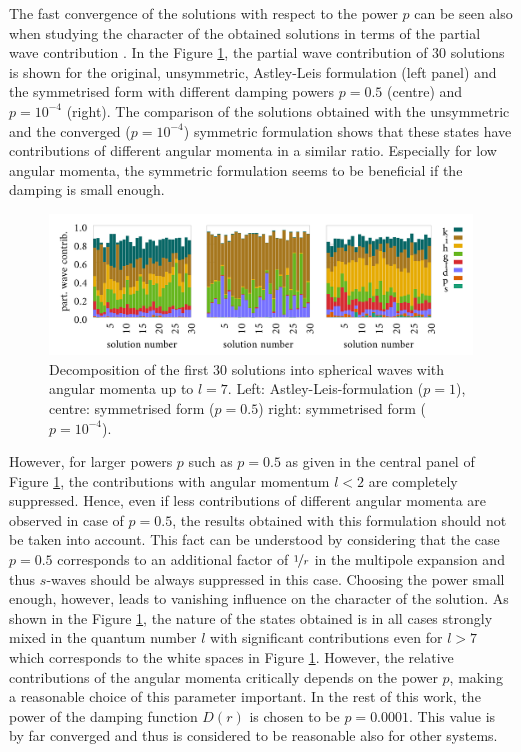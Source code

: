 The fast convergence of the solutions with respect to the power $p$ can be seen also when studying the character of the obtained solutions in terms of the partial wave contribution .
In the Figure \ref{fig:IFEMform_project}, the partial wave contribution of $30$ solutions is shown for the original, unsymmetric, Astley-Leis formulation (left panel) and the symmetrised form with different damping powers $p=0.5$ (centre) and $p=10^{-4}$ (right).
The comparison of the solutions obtained with the unsymmetric and the converged ($p=10^{-4}$) symmetric formulation shows that these states have contributions of different angular momenta in a similar ratio.
Especially for low angular momenta, the symmetric formulation seems to be beneficial if the damping is small enough.
\begin{figure}[h]
\includegraphics[width=\textwidth]{Figures/Ifem_forms}
\caption{Decomposition of the first $30$ solutions into spherical waves with angular momenta up to $l=7$.
Left: Astley-Leis-formulation ($p=1$), centre: symmetrised form ($p=0.5$) right: symmetrised form ($p=10^{-4}$).}
\label{fig:IFEMform_project}
\end{figure}
However, for larger powers $p$ such as $p=0.5$ as given in the central panel of Figure \ref{fig:IFEMform_project}, the contributions with angular momentum $l<2$ are completely suppressed.
Hence, even if less contributions of different angular momenta are observed in case of $p=0.5$, the results obtained with this formulation should not be taken into account.
This fact can be understood by considering that the case $p=0.5$ corresponds to an additional factor of $\nicefrac{1}{r}$ in the multipole expansion and thus $s$-waves should be always suppressed in this case.
Choosing the power small enough, however, leads to vanishing influence on the character of the solution.
As shown in the Figure \ref{fig:IFEMform_project}, the nature of the states obtained is in all cases strongly mixed in the quantum number $l$ with significant contributions even for $l>7$ which corresponds to the white spaces in Figure \ref{fig:IFEMform_project}.
However, the relative contributions of the angular momenta critically depends on the power $p$, making a reasonable choice of this parameter important.
In the rest of this work, the power of the damping function $D(r)$ is chosen to be $p=0.0001$.
This value is by far converged and thus is considered to be reasonable also for other systems.

